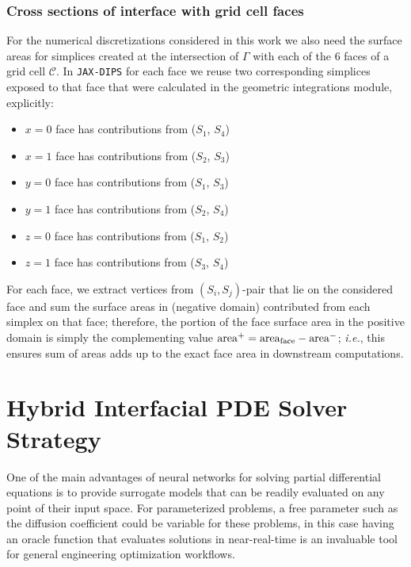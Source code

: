 \documentclass{elsarticle}
\begin{document}
\subsubsection{Cross sections of interface with grid cell faces}
For the numerical discretizations considered in this work we also need the surface areas for simplices created at the intersection of $\Gamma$ with each of the 6 faces of a grid cell $\mathcal{C}$. In \texttt{JAX-DIPS} for each face we reuse two corresponding simplices exposed to that face that were calculated in the geometric integrations module, explicitly: 
\begin{itemize}
	\item $x=0$ face has contributions from ($S_1$, $S_4$)
	\item $x=1$ face has contributions from ($S_2$, $S_3$)
	\item $y=0$ face has contributions from ($S_1$, $S_3$)
	\item $y=1$ face has contributions from ($S_2$, $S_4$)
	\item $z=0$ face has contributions from ($S_1$, $S_2$)
	\item $z=1$ face has contributions from ($S_3$, $S_4$)
\end{itemize}
For each face, we extract vertices from $(S_i,S_j)$-pair that lie on the considered face and sum the surface areas in (negative domain) contributed from each simplex on that face; therefore, the portion of the face surface area in the positive domain is simply the complementing value $\rm area^+=area_{face}-area^-$; \textit{i.e.}, this ensures sum of areas adds up to the exact face area in downstream computations.



\section{Hybrid Interfacial PDE Solver Strategy}
One of the main advantages of neural networks for solving partial differential equations is to provide surrogate models that can be readily evaluated on any point of their input space. For parameterized problems, a free parameter such as the diffusion coefficient could be variable for these problems, in this case having an oracle function that evaluates solutions in near-real-time is an invaluable tool for general engineering optimization workflows. 
\end{document}
